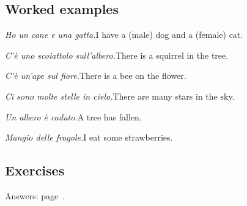 \documentclass[11pt,a4paper,twoside,openright]{book}
\begin{document}
\subsection*{Worked examples}
\begin{examples}
\item\relax \textit{Ho un cane e una gatta.}\newline I have a (male) dog and a (female) cat.
\item\relax \textit{C'è uno scoiattolo sull'albero.}\newline There is a squirrel in the tree.
\item\relax \textit{C'è un'ape sul fiore.}\newline There is a bee on the flower.
\item\relax \textit{Ci sono molte stelle in cielo.}\newline There are many stars in the sky.
\item\relax \textit{Un albero è caduto.}\newline A tree has fallen.
\item\relax \textit{Mangio delle fragole.}\newline I eat some strawberries.
\end{examples}

\subsection*{Exercises}\label{les:indefinite-articles:exercises}
{\color{muted}\small Answers: page~\pageref{ans:indefinite-articles}.}
\end{document}
